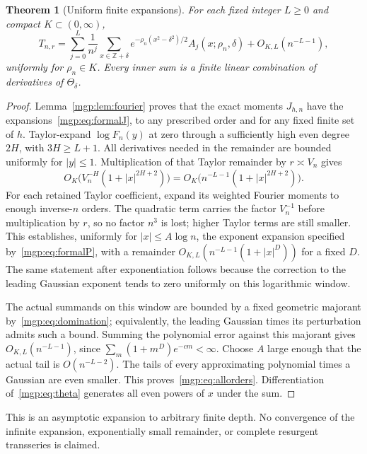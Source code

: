 \documentclass[11pt]{article}
\newtheorem{theorem}{Theorem}\newtheorem{lemma}[theorem]{Lemma}\newtheorem{corollary}[theorem]{Corollary}\newtheorem{remark}[theorem]{Remark}
\newcommand{\V}{V_n}\newcommand{\T}{T_{n,r}}\newcommand{\Z}{\mathbb Z}\newcommand{\E}{\mathbb E}\newcommand{\dd}{\,d}
\begin{document}
\begin{theorem}[Uniform finite expansions]\label{mgp:thm:allorders}
For each fixed integer $L\ge0$ and compact $K\subset(0,\infty)$,
\begin{equation}\label{mgp:eq:allorders}
 T_{n,r}=\sum_{j=0}^{L}\frac1{n^j}
 \sum_{x\in\Z+\delta}e^{-\rho_n(x^2-\delta^2)/2}
 A_j(x;\rho_n,\delta)+O_{K,L}(n^{-L-1}),
\end{equation}
uniformly for $\rho_n\in K$. Every inner sum is a finite linear combination of derivatives of $\Theta_\delta$.
\end{theorem}
\begin{proof}
Lemma~\ref{mgp:lem:fourier} proves that the exact moments $J_{h,n}$ have the expansions~\eqref{mgp:eq:formalJ}, to any prescribed order and for any fixed finite set of $h$. Taylor-expand $\log F_n(y)$ at zero through a sufficiently high even degree $2H$, with $3H\ge L+1$. All derivatives needed in the remainder are bounded uniformly for $|y|\le1$. Multiplication of that Taylor remainder by $r\asymp\V$ gives
\[
 O_K\bigl(\V^{-H}(1+|x|^{2H+2})\bigr)
 =O_K\bigl(n^{-L-1}(1+|x|^{2H+2})\bigr).
\]
For each retained Taylor coefficient, expand its weighted Fourier moments to enough inverse-$n$ orders. The quadratic term carries the factor $\V^{-1}$ before multiplication by $r$, so no factor $n^3$ is lost; higher Taylor terms are still smaller. This establishes, uniformly for $|x|\le A\log n$, the exponent expansion specified by~\eqref{mgp:eq:formalP}, with a remainder $O_{K,L}(n^{-L-1}(1+|x|^D))$ for a fixed $D$. The same statement after exponentiation follows because the correction to the leading Gaussian exponent tends to zero uniformly on this logarithmic window.

The actual summands on this window are bounded by a fixed geometric majorant by~\eqref{mgp:eq:domination}; equivalently, the leading Gaussian times its perturbation admits such a bound. Summing the polynomial error against this majorant gives $O_{K,L}(n^{-L-1})$, since $\sum_m(1+m^D)e^{-cm}<\infty$. Choose $A$ large enough that the actual tail is $O(n^{-L-2})$. The tails of every approximating polynomial times a Gaussian are even smaller. This proves~\eqref{mgp:eq:allorders}. Differentiation of~\eqref{mgp:eq:theta} generates all even powers of $x$ under the sum.
\end{proof}
This is an asymptotic expansion to arbitrary finite depth. No convergence of the infinite expansion, exponentially small remainder, or complete resurgent transseries is claimed.
\end{document}
